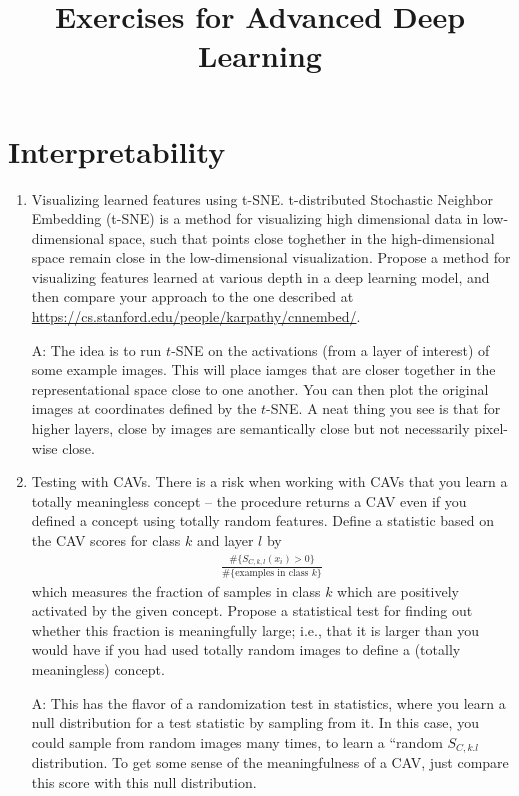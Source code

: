 \documentclass{article}
\title{Exercises for Advanced Deep Learning}
\begin{document}
\section{Interpretability}

\begin{enumerate}
\item Visualizing learned features using t-SNE. t-distributed Stochastic
  Neighbor Embedding (t-SNE) is a method for visualizing high dimensional data
  in low-dimensional space, such that points close toghether in the
  high-dimensional space remain close in the low-dimensional visualization.
  Propose a method for visualizing features learned at various depth in a deep
  learning model, and then compare your approach to the one described at
  \url{https://cs.stanford.edu/people/karpathy/cnnembed/}.

  A: The idea is to run $t$-SNE on the activations (from a layer of interest) of
  some example images. This will place iamges that are closer together in the
  representational space close to one another. You can then plot the original
  images at coordinates defined by the $t$-SNE. A neat thing you see is that for
  higher layers, close by images are semantically close but not necessarily
  pixel-wise close.

  \item Testing with CAVs. There is a risk when working with CAVs that you learn
    a totally meaningless concept -- the procedure returns a CAV even if you
    defined a concept using totally random features. Define a statistic based on
    the CAV scores for class $k$ and layer $l$ by
    \begin{align*}
      \frac{\#\{S_{C, k, l}\left(x_i\right) > 0\}}{\#\{\text{examples in class } k\}}
    \end{align*}
    which measures the fraction of samples in class $k$ which are positively
    activated by the given concept. Propose a statistical test for finding out
    whether this fraction is meaningfully large; i.e., that it is larger than
    you would have if you had used totally random images to define a (totally
    meaningless) concept.

    A: This has the flavor of a randomization test in statistics, where you
    learn a null distribution for a test statistic by sampling from it. In this
    case, you could sample from random images many times, to learn a ``random
    $S_{C,k.l}$ distribution. To get some sense of the meaningfulness of a CAV,
    just compare this score with this null distribution.
\end{enumerate}
\end{document}
